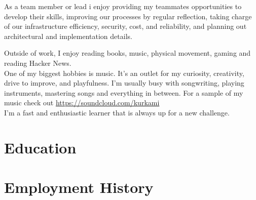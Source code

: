 \documentclass[10pt]{article} %
\begin{document}
As a team member or lead i enjoy providing my teammates opportunities to develop their skills, improving our processes by regular reflection, taking charge of our infrastructure efficiency, security, cost, and reliability, and planning out architectural and implementation details. 

Outside of work, I enjoy reading books, music, physical movement, gaming and reading Hacker News. \\

One of my biggest hobbies is music. It's an outlet for my curiosity, creativity, drive to improve, and playfulness. I'm usually busy with songwriting, playing instruments, mastering songs and everything in between. For a sample of my music check out \href{https://soundcloud.com/kurkami}{https://soundcloud.com/kurkami}  \\

I'm a fast and enthusiastic learner that is always up for a new challenge.


\section{Education}





\section{Employment History}
\end{document}
